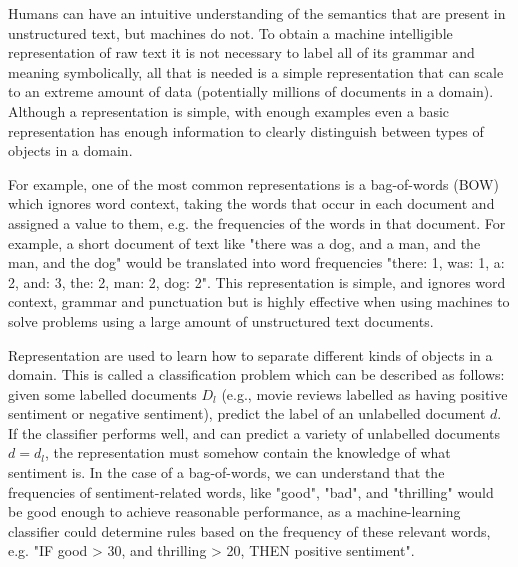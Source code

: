 
Humans can have an intuitive understanding of the semantics that are present in unstructured text, but machines do not.  To obtain a machine intelligible representation of raw text it is not necessary to  label all of its grammar and meaning symbolically, all that is needed is a simple representation that can scale to an extreme amount of data (potentially millions of documents in a domain). Although a representation is simple, with enough examples even a basic representation has enough information to clearly distinguish between types of objects in a domain.

For example, one of the most common representations is a bag-of-words (BOW) which ignores word context, taking the words that occur in each document and assigned a value to them, e.g. the frequencies of the words in that document. For example, a short document of text like "there was a dog, and a man, and the man, and the dog" would be translated into word frequencies "there: 1, was: 1, a: 2, and: 3, the: 2, man: 2, dog: 2". This representation is simple, and ignores word context, grammar and punctuation but is highly effective when using machines to solve problems using a large amount of unstructured text documents.


Representation are  used to learn how to separate different kinds of objects in a domain. This is called a classification problem which can be described as follows: given some labelled documents $D_l$ (e.g., movie reviews labelled as having positive sentiment or negative sentiment), predict the label of an unlabelled document $d$. If the classifier performs well, and can predict a variety of unlabelled documents $d = d_l$, the representation must somehow contain the knowledge of what sentiment is. In the case of a bag-of-words, we can understand that the frequencies of sentiment-related words, like "good", "bad", and "thrilling" would be good enough to achieve reasonable performance, as a machine-learning classifier could determine rules based on the frequency of these relevant words, e.g. "IF good > 30, and thrilling > 20, THEN positive sentiment".

